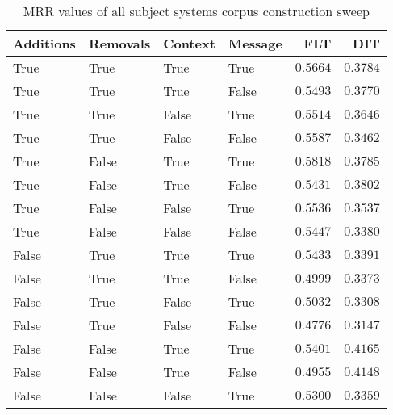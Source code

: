 
\begin{table}
\begin{spacing}{1.2}
\centering
\caption{MRR values of all subject systems corpus construction sweep}
\label{table:all_corpus_sweep}
\vspace{0.2em}
\begin{tabular}{llll|rr}
\toprule
Additions & Removals & Context & Message &           FLT &           DIT \\
\midrule
     True &     True &    True &    True &      $0.5664$ &      $0.3784$ \\
     \myrowcolor True &     True &    True &   False &      $0.5493$ &      $0.3770$ \\
     True &     True &   False &    True &      $0.5514$ &      $0.3646$ \\
     True &     True &   False &   False &      $0.5587$ &      $0.3462$ \\
     True &    False &    True &    True & $\bm{0.5818}$ &      $0.3785$ \\
     True &    False &    True &   False &      $0.5431$ &      $0.3802$ \\
     True &    False &   False &    True &      $0.5536$ &      $0.3537$ \\
     True &    False &   False &   False &      $0.5447$ &      $0.3380$ \\
    False &     True &    True &    True &      $0.5433$ &      $0.3391$ \\
    False &     True &    True &   False &      $0.4999$ &      $0.3373$ \\
    False &     True &   False &    True &      $0.5032$ &      $0.3308$ \\
    False &     True &   False &   False &      $0.4776$ &      $0.3147$ \\
    False &    False &    True &    True &      $0.5401$ & $\bm{0.4165}$ \\
    False &    False &    True &   False &      $0.4955$ &      $0.4148$ \\
    False &    False &   False &    True &      $0.5300$ &      $0.3359$ \\
\bottomrule
\end{tabular}

\end{spacing}
\end{table}
